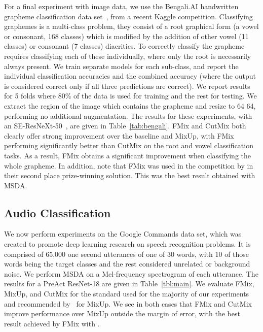 \documentclass[journal]{IEEEtran}
\newcommand{\fmix}{FMix\xspace}
\newcommand{\mixup}{MixUp\xspace}
\newcommand{\cutmix}{CutMix\xspace}
\begin{document}
For a final experiment with image data, we use the Bengali.AI handwritten grapheme classification data set~\citep{bengali}, from a recent Kaggle competition.
Classifying graphemes is a multi-class problem, they consist of a root graphical form (a vowel or consonant, 168 classes) which is modified by the addition of other vowel (11 classes) or consonant (7 classes) diacritics. To correctly classify the grapheme requires classifying each of these individually, where only the root is necessarily always present. We train separate models for each sub-class, and report the individual classification accuracies and the combined accuracy (where the output is considered correct only if all three predictions are correct). We report results for 5 folds where 80\% of the data is used for training and the rest for testing. We extract the region of the image which contains the grapheme and resize to 64  64, performing no additional augmentation. The results for these experiments, with an SE-ResNeXt-50~\citep{xie2017aggregated,hu2018squeeze}, are given in Table~\ref{tab:bengali}. \fmix and \cutmix both clearly offer strong improvement over the baseline and \mixup, with \fmix performing significantly better than \cutmix on the root and vowel classification tasks. As a result, \fmix obtains a significant improvement when classifying the whole grapheme. In addition, note that \fmix was used in the competition by \citet{singer2020bengali} in their second place prize-winning solution. This was the best result obtained with MSDA.



\subsection{Audio Classification}
We now perform experiments on the Google Commands data set, which was created to promote deep learning research on speech recognition problems. It is comprised of 65,000 one second utterances of one of 30 words, with 10 of those words being the target classes and the rest considered unrelated or background noise.
We perform MSDA on a Mel-frequency spectrogram of each utterance.
The results for a PreAct ResNet-18 are given in Table~\ref{tbl:main}. We evaluate \fmix, \mixup, and \cutmix for the standard  used for the majority of our experiments and  recommended by~\citet{zhang2017mixup} for \mixup. We see in both cases that \fmix and \cutmix improve performance over \mixup outside the margin of error, with the best result achieved by \fmix with .
\end{document}
